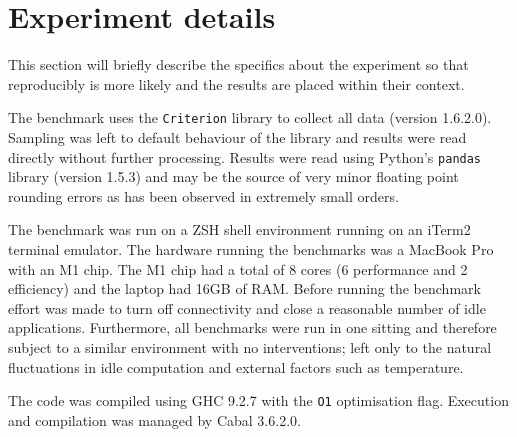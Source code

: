 \section{Experiment details}
This section will briefly describe the specifics about the experiment so that
reproducibly is more likely and the results are placed within their context.

The benchmark uses the \verb|Criterion| library to collect all data (version
1.6.2.0). Sampling was left to default behaviour of the library and results were
read directly without further processing. Results were read using Python's
\verb|pandas| library (version 1.5.3) and may be the source of very minor floating point
rounding errors as has been observed in extremely small orders.

The benchmark was run on a ZSH shell environment running on an iTerm2 terminal
emulator. The hardware running the benchmarks was a MacBook Pro with an M1 chip.
The M1 chip had a total of 8 cores (6 performance and 2 efficiency) and the
laptop had 16GB of RAM. Before running the benchmark effort was made to turn off
connectivity and close a reasonable number of idle applications. Furthermore,
all benchmarks were run in one sitting and therefore subject to a similar
environment with no interventions; left only to the natural fluctuations in idle
computation and external factors such as temperature.

The code was compiled using GHC 9.2.7 with the \verb|O1| optimisation flag.
Execution and compilation was managed by Cabal 3.6.2.0.

